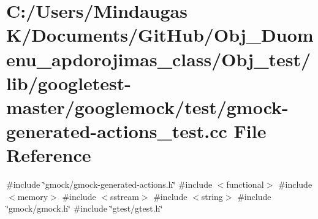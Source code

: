 \hypertarget{_obj__test_2lib_2googletest-master_2googlemock_2test_2gmock-generated-actions__test_8cc}{}\section{C\+:/\+Users/\+Mindaugas K/\+Documents/\+Git\+Hub/\+Obj\+\_\+\+Duomenu\+\_\+apdorojimas\+\_\+class/\+Obj\+\_\+test/lib/googletest-\/master/googlemock/test/gmock-\/generated-\/actions\+\_\+test.cc File Reference}
\label{_obj__test_2lib_2googletest-master_2googlemock_2test_2gmock-generated-actions__test_8cc}
{\ttfamily \#include \char`\"{}gmock/gmock-\/generated-\/actions.\+h\char`\"{}}\newline
{\ttfamily \#include $<$functional$>$}\newline
{\ttfamily \#include $<$memory$>$}\newline
{\ttfamily \#include $<$sstream$>$}\newline
{\ttfamily \#include $<$string$>$}\newline
{\ttfamily \#include \char`\"{}gmock/gmock.\+h\char`\"{}}\newline
{\ttfamily \#include \char`\"{}gtest/gtest.\+h\char`\"{}}\newline
